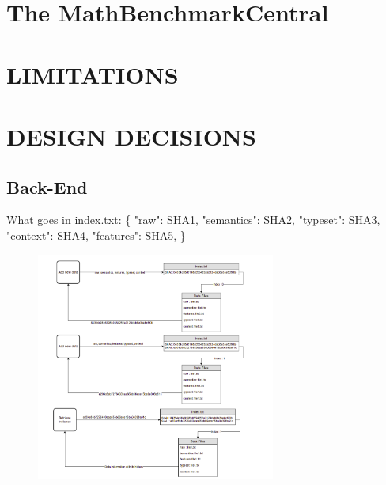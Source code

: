 \documentclass[12pt,twoside]{article}
\newcommand\tab[1][1cm]{\hspace*{#1}}
\begin{document}
	\section{The MathBenchmarkCentral}
	
	
	\section{LIMITATIONS}
	
	\section{DESIGN DECISIONS}
		\subsection*{Back-End}
		What goes in index.txt: \newline
		\{ \newline
			\tab "raw": SHA1, \newline
			\tab "semantics": SHA2, \newline
			\tab "typeset": SHA3, \newline
			\tab "context": SHA4, \newline
			\tab "features": SHA5, \newline
		\}
		
		\begin{figure}[!ht]
			\centering
			\includegraphics[width=0.7\textwidth]{figures/Scenario1Backend.png}
		\end{figure}
		
\end{document}
